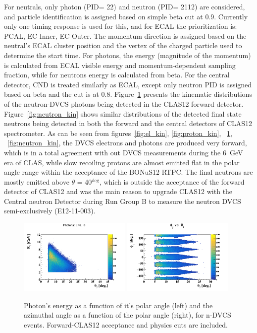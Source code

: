For neutrals, only photon (PID= 22) and neutron (PID= 2112) are considered, and 
particle identification is assigned based on simple beta cut at 0.9. Currently 
only one timing response is used for this, and for ECAL the prioritization is: 
PCAL, EC Inner, EC Outer. The momentum direction is assigned based on the 
neutral's ECAL cluster position and the vertex of the charged particle used to 
determine the start time. For photons, the energy (magnitude of the momentum) 
is calculated from ECAL visible energy and momentum-dependent sampling 
fraction, while for neutrons energy is calculated from beta. For the central 
detector, CND is treated similarly as ECAL, except only neutron PID is assigned 
based on beta and the cut is at 0.8. Figure~\ref{fig:photon_kin} presents the 
kinematic distributions of the neutron-DVCS photons being detected in the 
CLAS12 forward detector. Figure~\ref{fig:neutron_kin} shows similar 
distributions of the detected final state neutrons being detected in both the 
forward and the central detectors of CLAS12 spectrometer. As can be seen from 
figures~\ref{fig:el_kin}, \ref{fig:proton_kin}, ~\ref{fig:photon_kin}, 
~\ref{fig:neutron_kin}, the DVCS electrons and photons are produced very 
forward, which is in a total agreement with out DVCS measurements during the 
6~GeV era of CLAS, while slow recoiling protons are almost emitted flat in the 
polar angle range within the acceptance of the BONuS12 RTPC. The final neutrons 
are mostly emitted above $\theta$ = 40$^{\deg}$, which is outside the 
acceptance of the forward detector of CLAS12 and was the main reason to upgrade 
CLAS12 with the Central neutron Detector during Run Group B to measure the 
neutron DVCS semi-exclusively (E12-11-003).  


\begin{figure}[htb]
\centering
   \includegraphics[width=0.48\textwidth,clip,trim=0mm 0mm 0mm 
   20mm]{figs/gamma_E_theta.png}
\includegraphics[width=0.48\textwidth,clip,trim=0mm 0mm 0mm 
   20mm]{figs/gamma_phi_theta.png}
   \caption{Photon's energy as a function of it's polar angle (left) and the 
   azimuthal angle as a function of the polar angle (right), for n-DVCS events.  
   Forward-CLAS12 acceptance and physics cuts are included.}
   \label{fig:photon_kin}
\end{figure}
 

